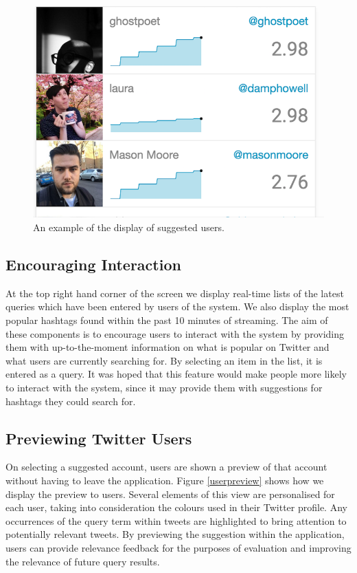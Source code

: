 \documentclass{l4proj}
\begin{document}
\begin{figure}[H]
\centering
\includegraphics[scale=0.9]{queryresults.png}
\caption{An example of the display of suggested users.}
\label{queryresults}
\end{figure} 
        
        \subsection{Encouraging Interaction}
        At the top right hand corner of the screen we display real-time lists of the latest queries which have been entered by users of the system. We also display the most popular hashtags found within the past 10 minutes of streaming. The aim of these components is to encourage users to interact with the system by providing them with up-to-the-moment information on what is popular on Twitter and what users are currently searching for. By selecting an item in the list, it is entered as a query. It was hoped that this feature would make people more likely to interact with the system, since it may provide them with suggestions for hashtags they could search for.
        
        \subsection{Previewing Twitter Users}
        On selecting a suggested account, users are shown a preview of that account without having to leave the application. Figure \ref{userpreview} shows how we display the preview to users. Several elements of this view are personalised for each user, taking into consideration the colours used in their Twitter profile. Any occurrences of the query term within tweets are highlighted to bring attention to potentially relevant tweets. By previewing the suggestion within the application, users can provide relevance feedback for the purposes of evaluation and improving the relevance of future query results.
        
\end{document}
